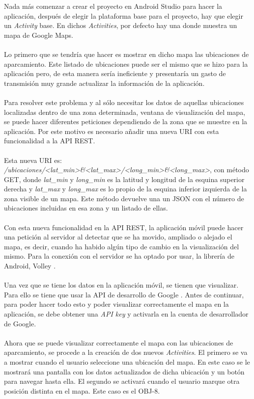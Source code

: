 Nada más comenzar a crear el proyecto en Android Studio para hacer la aplicación, después de elegir la plataforma base para el proyecto, hay que elegir un \textit{Activity} base. En dichos \textit{Activities}, por defecto hay una donde muestra un mapa de Google Maps.
\\\\
Lo primero que se tendría que hacer es mostrar en dicho mapa las ubicaciones de aparcamiento. Este listado de ubicaciones puede ser el mismo que se hizo para la aplicación pero, de esta manera sería ineficiente y presentaría un gasto de transmisión muy grande actualizar la información de la aplicación.
\\\\
Para resolver este problema y al sólo necesitar los datos de aquellas ubicaciones localizadas dentro de una zona determinada, ventana de visualización del mapa, se puede hacer diferentes peticiones dependiendo de la zona que se muestre en la aplicación. Por este motivo es necesario añadir una nueva URI con esta funcionalidad a la API REST.
\\\\
Esta nueva URI es:
\\
\textit{/ubicaciones/<lat\_min>\&<lat\_max>/<long\_min>\&<long\_max>}, con método GET, donde \textit{lat\_min} y \textit{long\_min} es la latitud y longitud de la esquina superior derecha y \textit{lat\_max} y \textit{long\_max} es lo propio de la esquina inferior izquierda de la zona visible de un mapa. Este método devuelve una un JSON con el número de ubicaciones incluidas en esa zona y un listado de ellas.
\\\\
Con esta nueva funcionalidad en la API REST, la aplicación móvil puede hacer una petición al servidor al detectar que se ha movido, ampliado o alejado el mapa, es decir, cuando ha habido algún tipo de cambio en la visualización del mismo. Para la conexión con el servidor se ha optado por usar, la librería de Android, Volley \cite{volley}.
\\\\
Una vez que se tiene los datos en la aplicación móvil, se tienen que visualizar. Para ello se tiene que usar la API de desarrollo de Google \cite{android-maps}. Antes de continuar, para poder hacer todo esto y poder visualizar correctamente el mapa en la aplicación, se debe obtener una \textit{API key} y activarla en la cuenta de desarrollador de Google.
\\\\
Ahora que se puede visualizar correctamente el mapa con las ubicaciones de aparcamiento, se procede a la creación de dos nuevos \textit{Activities}. El primero se va a mostrar cuando el usuario seleccione una ubicación del mapa. En este caso se le mostrará una pantalla con los datos actualizados de dicha ubicación y un botón para navegar hasta ella. El segundo se activará cuando el usuario marque otra posición distinta en el mapa. Este caso es el OBJ-8.
